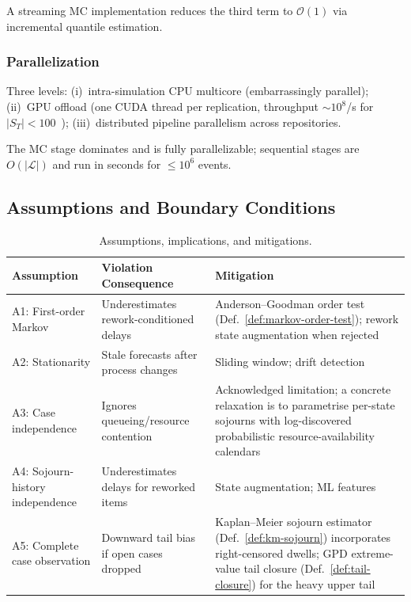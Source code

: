 A streaming MC implementation reduces the third term to
$\mathcal{O}(1)$ via incremental quantile estimation.

\subsubsection{Parallelization}

Three levels: (i)~intra-simulation CPU multicore (embarrassingly
parallel); (ii)~GPU offload (one CUDA thread per replication, throughput
$\sim 10^8$/s for $|S_T| < 100$~\cite{lecuyer2017random});
(iii)~distributed pipeline parallelism across repositories.

\begin{remark}
\label{rem:scalability}
The MC stage dominates and is fully parallelizable; sequential stages are
$O(|\mathcal{L}|)$ and run in seconds for $\leq 10^6$ events.
\end{remark}


\subsection{Assumptions and Boundary Conditions}
\label{sec:assumptions}

\begin{table}[htbp]
\centering
\caption{Assumptions, implications, and mitigations.}
\label{tab:assumptions}
\small
\begin{tabular}{p{3.5cm}p{4cm}p{4cm}}
\toprule
\textbf{Assumption} & \textbf{Violation Consequence} & \textbf{Mitigation} \\
\midrule
A1: First-order Markov         & Underestimates rework-conditioned delays   & Anderson--Goodman order test (Def.~\ref{def:markov-order-test}); rework state augmentation when rejected \\
\midrule
A2: Stationarity                & Stale forecasts after process changes      & Sliding window; drift detection \\
\midrule
A3: Case independence           & Ignores queueing/resource contention       & Acknowledged limitation; a concrete relaxation is to parametrise per-state sojourns with log-discovered probabilistic resource-availability calendars~\cite{lopezpintado2023} \\
\midrule
A4: Sojourn-history independence & Underestimates delays for reworked items  & State augmentation; ML features \\
\midrule
A5: Complete case observation   & Downward tail bias if open cases dropped   & Kaplan--Meier sojourn estimator (Def.~\ref{def:km-sojourn}) incorporates right-censored dwells; GPD extreme-value tail closure (Def.~\ref{def:tail-closure}) for the heavy upper tail \\
\bottomrule
\end{tabular}
\end{table}


